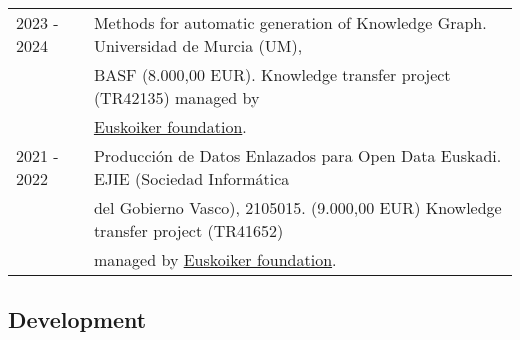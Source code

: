 \documentclass[11pt,fullpage]{article}
\begin{document}
\begin{tabular}{ll}
2023 - 2024 &  Methods for automatic generation of Knowledge Graph. Universidad de Murcia (UM), \\ 
            &  BASF (8.000,00 EUR). Knowledge transfer project (TR42135) managed by \\ 
            & \href{http://www.euskoiker.ehu.es/faq-3}{Euskoiker foundation}. \\
2021 - 2022 &  Producci\'on de Datos Enlazados para Open Data Euskadi. EJIE (Sociedad Inform\'atica \\ 
            &  del Gobierno Vasco), 2105015. (9.000,00 EUR) Knowledge transfer project (TR41652) \\ 
            &  managed by \href{http://www.euskoiker.ehu.es/faq-3}{Euskoiker foundation}. \\ 
\end{tabular}

\subsection*{Development}
\end{document}
